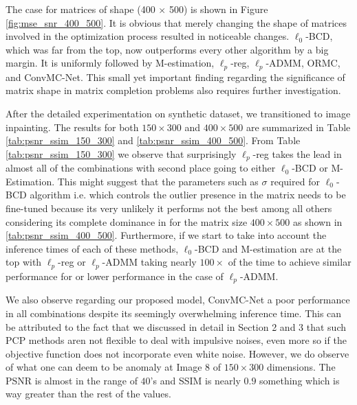 The case for matrices of shape (400 \(\times\) 500) is shown in Figure \ref{fig:mse_snr_400_500}. It is obvious that merely changing the shape of matrices involved in the optimization process resulted in noticeable changes. \(\ell_0\)-BCD, which was far from the top, now outperforms every other algorithm by a big margin. It is uniformly followed by M-estimation, \(\ell_p\)-reg, \(\ell_p\)-ADMM, ORMC, and ConvMC-Net. This small yet important finding regarding the significance of matrix shape in matrix completion problems also requires further investigation.

After the detailed experimentation on synthetic dataset, we transitioned to image inpainting. The results for both $150 \times 300$ and $400 \times 500$ are summarized in Table \ref{tab:psnr_ssim_150_300} and \ref{tab:psnr_ssim_400_500}. From Table \ref{tab:psnr_ssim_150_300} we observe that surprisingly $\ell_{p}$-reg takes the lead in almost all of the combinations with second place going to either $\ell_{0}$-BCD or M-Estimation. This might suggest that the parameters such as $\sigma$ required for $\ell_{0}$-BCD algorithm i.e. which controls the outlier presence in the matrix needs to be fine-tuned because its very unlikely it performs not the best among all others considering its complete dominance in for the matrix size $400 \times 500$ as shown in \ref{tab:psnr_ssim_400_500}. Furthermore, if we start to take into account the inference times of each of these methods, $\ell_{0}$-BCD and M-estimation are at the top with $\ell_{p}$-reg or $\ell_{p}$-ADMM taking nearly $100\times$ of the time to achieve similar performance for or lower performance in the case of $\ell_{p}$-ADMM. 

We also observe regarding our proposed model, ConvMC-Net a poor performance in all combinations despite its seemingly overwhelming inference time. This can be attributed to the fact that we discussed in detail in Section 2 and 3 that such PCP methods aren not flexible to deal with impulsive noises, even more so if the objective function does not incorporate even white noise. However, we do observe of what one can deem to be anomaly at Image 8 of $150 \times 300$ dimensions. The PSNR is almost in the range of $40$'s and SSIM is nearly $0.9$ something which is way greater than the rest of the values. 


